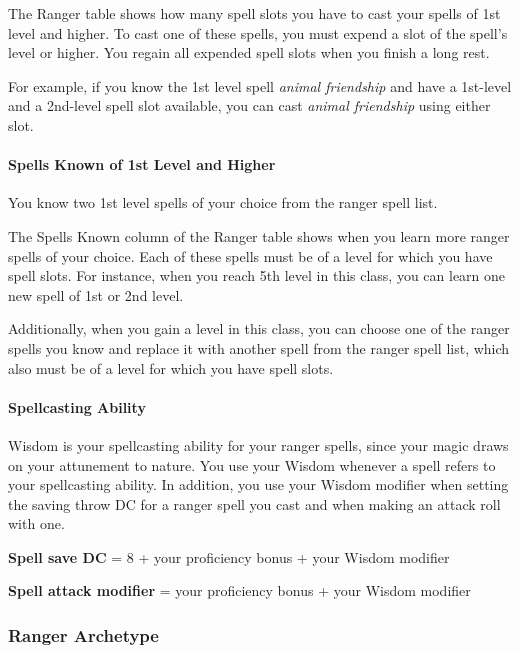 \documentclass[
]{article}
\begin{document}
The Ranger table shows how many spell slots you have to cast your spells
of 1st level and higher. To cast one of these spells, you must expend a
slot of the spell's level or higher. You regain all expended spell slots
when you finish a long rest.

For example, if you know the 1st level spell \emph{animal friendship}
and have a 1st-level and a 2nd-level spell slot available, you can cast
\emph{animal friendship} using either slot.

\hypertarget{spells-known-of-1st-level-and-higher}{%
\paragraph{Spells Known of 1st Level and
Higher}\label{spells-known-of-1st-level-and-higher}}

You know two 1st level spells of your choice from the ranger spell list.

The Spells Known column of the Ranger table shows when you learn more
ranger spells of your choice. Each of these spells must be of a level
for which you have spell slots. For instance, when you reach 5th level
in this class, you can learn one new spell of 1st or 2nd level.

Additionally, when you gain a level in this class, you can choose one of
the ranger spells you know and replace it with another spell from the
ranger spell list, which also must be of a level for which you have
spell slots.

\hypertarget{spellcasting-ability}{%
\paragraph{Spellcasting Ability}\label{spellcasting-ability}}

Wisdom is your spellcasting ability for your ranger spells, since your
magic draws on your attunement to nature. You use your Wisdom whenever a
spell refers to your spellcasting ability. In addition, you use your
Wisdom modifier when setting the saving throw DC for a ranger spell you
cast and when making an attack roll with one.

\textbf{Spell save DC} = 8 + your proficiency bonus + your Wisdom
modifier

\textbf{Spell attack modifier} = your proficiency bonus + your Wisdom
modifier

\hypertarget{ranger-archetype}{%
\subsubsection{Ranger Archetype}\label{ranger-archetype}}
\end{document}
